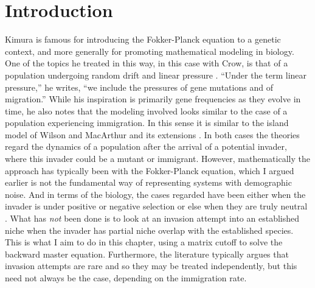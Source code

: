 \section{Introduction}%
Kimura is famous for introducing the Fokker-Planck equation to a genetic context, and more generally for promoting mathematical modeling in biology. 
One of the topics he treated in this way, in this case with Crow, is that of a population undergoing random drift and linear pressure \cite{Crow1956,Kimura1964}. 
``Under the term linear pressure,'' he writes, ``we include the pressures of gene mutations and of migration.'' 
While his inspiration is primarily gene frequencies as they evolve in time, he also notes that the modeling involved looks similar to the case of a population experiencing immigration. 
In this sense it is similar to the island model of Wilson and MacArthur  and its extensions \cite{MacArthur2001,Hubbell2001,Kessler2015}. %
In both cases the theories regard the dynamics of a population after the arrival of a potential invader, where this invader could be a mutant or immigrant. 
However, mathematically the approach has typically been with the Fokker-Planck equation, which I argued earlier is not the fundamental way of representing systems with demographic noise. %
And in terms of the biology, the cases regarded have been either when the invader is under positive or negative selection \cite{Kimura1955} or else when they are truly neutral \cite{Kimura1956,Hubbell2001}. %
What has \emph{not} been done is to look at an invasion attempt into an established niche when the invader has partial niche overlap with the established species. 
This is what I aim to do in this chapter, using a matrix cutoff to solve the backward master equation. 
Furthermore, the literature typically argues that invasion attempts are rare and so they may be treated independently, but this need not always be the case, depending on the immigration rate. %

